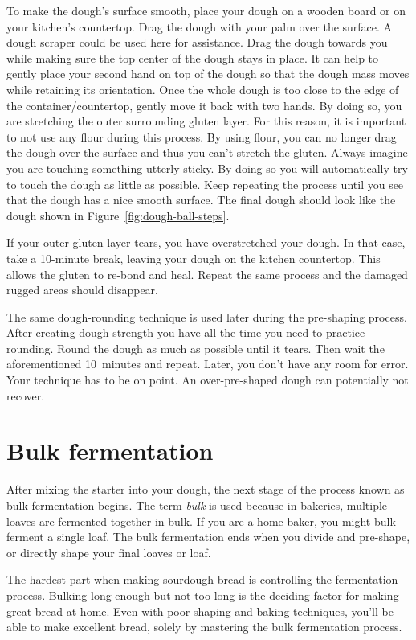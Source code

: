 To make the dough's surface smooth, place your dough on a wooden board or
on your kitchen's countertop. Drag the dough with your palm over the surface.
A dough scraper could be used here for assistance.
Drag the dough towards you while making sure the top center of the dough stays in place.
It can help to gently place your second hand on top of the dough so that
the dough mass moves while retaining its orientation. Once the whole dough
is too close to the edge of the container/countertop, gently move it back
with two hands. By doing so, you are stretching the outer surrounding gluten layer.
For this reason, it is important to not use any flour during this process.
By using flour, you can no longer drag the dough over the surface and thus
you can't stretch the gluten. Always imagine you are touching something utterly sticky.
By doing so you will automatically try to touch the dough as little
as possible. Keep repeating the process until you see that the dough
has a nice smooth surface. The final dough should look like the dough
shown in Figure~\ref{fig:dough-ball-steps}.

If your outer gluten layer tears, you have overstretched your dough. In
that case, take a 10-minute break, leaving your dough on the kitchen countertop.
This allows the gluten to re-bond and heal. Repeat the same process
and the damaged rugged areas should disappear.

The same dough-rounding technique is used later during
the pre-shaping process. After creating dough strength you
have all the time you need to practice rounding. Round the dough
as much as possible until it tears. Then wait the aforementioned 10~minutes and repeat.
Later, you don't have any room for error. Your technique has to be on point.
An over-pre-shaped dough can potentially not recover.

\section{Bulk fermentation}%
\label{sec:bulk-fermentation}

After mixing the starter into your dough, the next stage of
the process known as bulk fermentation begins. The term
\emph{bulk} is used because in bakeries, multiple loaves are fermented
together in bulk. If you are a home baker, you might bulk
ferment a single loaf. The bulk fermentation ends when you
divide and pre-shape, or directly shape your final loaves or loaf.

The hardest part when making sourdough bread is controlling
the fermentation process. Bulking long enough but not too
long is the deciding factor for making great bread at home.
Even with poor shaping and baking techniques, you'll be able
to make excellent bread, solely by mastering the bulk
fermentation process.

